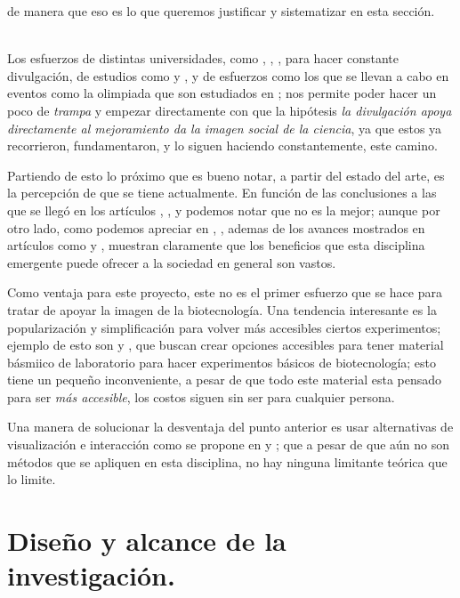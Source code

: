 \documentclass[12pt]{article}
\begin{document}
	\noindent de manera que eso es lo que queremos justificar y sistematizar en esta sección.
	\ \\ \
	\par Los esfuerzos de distintas universidades,  como \cite{UG}, \cite{UdG}, \cite{unam}, para hacer constante divulgación, de estudios como \cite{utilidad congresos} y \cite{CC}, y de esfuerzos como los que se llevan a cabo en eventos como la olimpiada que son estudiados en \cite{olimpiadas}; nos permite poder hacer un poco de \textit{trampa} y empezar directamente con que la hipótesis \textit{la divulgación apoya directamente al mejoramiento da la imagen social de la ciencia}, ya que estos ya recorrieron, fundamentaron, y lo siguen haciendo constantemente, este camino.
	\par Partiendo de esto lo próximo que es bueno notar, a partir del estado del arte, es la percepción de que se tiene actualmente. En función de las conclusiones a las que se llegó en los artículos \cite{bio en espania}, \cite{a}, \cite{biot mexico} y \cite{b} podemos notar que no es la mejor; aunque por otro lado, como podemos apreciar en \cite{biohacker}, \cite{usos}, ademas de los avances mostrados en artículos como  \cite{genetica en colombia} y \cite{socializacion}, muestran claramente que los beneficios que esta disciplina emergente puede ofrecer a la sociedad en general son vastos.
	\par Como ventaja para este proyecto, este no es el primer esfuerzo que se hace para tratar de apoyar la imagen de la biotecnología. Una tendencia interesante es la popularización y simplificación para volver más accesibles ciertos experimentos; ejemplo de esto son \cite{kits} y \cite{kits2}, que buscan crear opciones accesibles para tener material básmiico de laboratorio para hacer experimentos básicos de biotecnología; esto tiene un pequeño inconveniente, a pesar de que todo este material esta pensado para ser \textit{más accesible}, los costos siguen sin ser para cualquier persona. 
	\par Una manera de solucionar la desventaja del punto anterior es usar alternativas de visualización e interacción como se propone en \cite{vr} y \cite{vr2}; que a pesar de que aún no son métodos que se apliquen en esta disciplina, no hay ninguna limitante teórica que lo limite.



\newpage
\section {Diseño y alcance de la investigación.}
\end{document}
